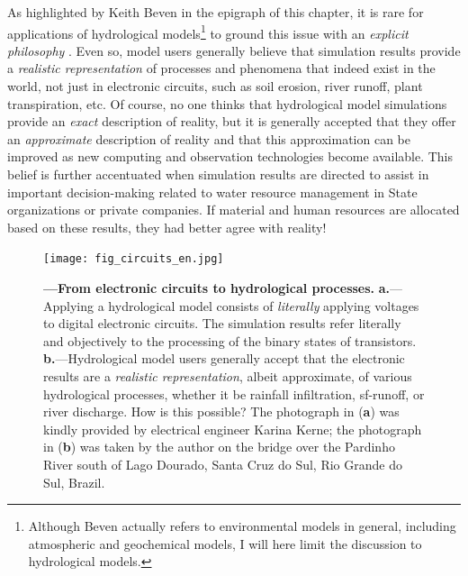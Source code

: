 \documentclass[./main_en.tex]{subfiles}
\begin{document}
\par As highlighted by Keith Beven in the epigraph of this chapter, it is rare for applications of hydrological models\footnote{Although Beven actually refers to environmental models in general, including atmospheric and geochemical models, I will here limit the discussion to hydrological models.} to ground this issue with an \textit{explicit philosophy} \cite{Beven2002a}. Even so, model users generally believe that simulation results provide a \textit{realistic representation} of processes and phenomena that indeed exist in the world, not just in electronic circuits, such as soil erosion, river runoff, plant transpiration, etc. Of course, no one thinks that hydrological model simulations provide an \textit{exact} description of reality, but it is generally accepted that they offer an \textit{approximate} description of reality and that this approximation can be improved as new computing and observation technologies become available. This belief is further accentuated when simulation results are directed to assist in important decision-making related to water resource management in State organizations or private companies. If material and human resources are allocated based on these results, they had better agree with reality!

\begin{figure}[t!] %
	\centering				
	\texttt{[image: fig\_circuits\_en.jpg]}		
	\caption[From electronic circuits to hydrological processes]
	{\textbf{---\;From electronic circuits to hydrological processes.}
        \;\textbf{a.}\;---\;Applying a hydrological \gls{model} consists of \textit{literally} applying voltages to digital electronic circuits. The simulation results refer literally and objectively to the processing of the binary states of transistors. \;\textbf{b.}\;---\;Hydrological model users generally accept that the electronic results are a \textit{realistic representation}, albeit approximate, of various hydrological processes, whether it be rainfall infiltration, \gls{sf-runoff}, or river discharge. How is this possible? The photograph in (\textbf{a}) was kindly provided by electrical engineer Karina Kerne; the photograph in (\textbf{b}) was taken by the author on the bridge over the Pardinho River south of Lago Dourado, Santa Cruz do Sul, Rio Grande do Sul, Brazil.
	}
\label{fig:circuits}  %
\end{figure}
\end{document}

